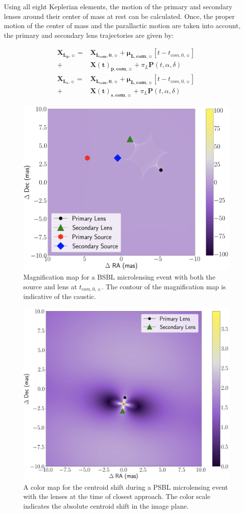 \documentclass[twocolumn]{aastex701}
\newcommand{\vect}[1]{\boldsymbol{#1}}
\newcommand{\mulsysvec}{\vect{\mu}_{\boldsymbol{L, com},\sun}}
\newcommand{\Xlcomvec}{\vect{X}_{\boldsymbol{L_{com},0},\sun}}
\newcommand{\Xlpvec}{\vect{X}_{\boldsymbol{L_p},\sun}}
\newcommand{\Xlsvec}{\vect{X}_{\boldsymbol{L_s},\sun}}
\newcommand{\Xcomp}{\vect{X(t)}_{\boldsymbol{p},\boldsymbol{com},\sun}}
\newcommand{\Xcoms}{\vect{X(t)}_{\boldsymbol{s},\boldsymbol{com},\sun}}
\newcommand{\tcomnot}{t_{com,0,\sun}}
\begin{document}
Using all eight Keplerian elements, the motion of the primary and secondary lenses around their center of mass at rest can be calculated. Once, the proper motion of the center of mass and the parallactic motion are taken into account, the primary and secondary lens trajectories are given by:

\begin{align}
    \Xlpvec =& \Xlcomvec + \mulsysvec [t - \tcomnot] \nonumber \\
    +& \Xcomp + \pi_L \vect{P}(t, \alpha, \delta) \\
    \Xlsvec =& \Xlcomvec + \mulsysvec [t - \tcomnot] \nonumber \\
    +& \Xcoms + \pi_L \vect{P}(t, \alpha, \delta) 
\end{align}

\begin{figure}
    \centering
    \includegraphics[width= 0.5 \textwidth]{figures/magmap.png}
    \caption{Magnification map for a BSBL microlensing event with both the source and lens at $\tcomnot$. The contour of the magnification map is indicative of the caustic. }
    \label{fig:magmaps}
\end{figure}


\begin{figure}
    \centering
    \includegraphics[width= 0.5 \textwidth]{figures/csmap.png}
    \caption{A color map for the centroid shift during a PSBL microlensing event with the lenses at the time of closest approach. The color scale indicates the absolute centroid shift in the image plane.}
    \label{fig:csmap}
\end{figure}
\end{document}
